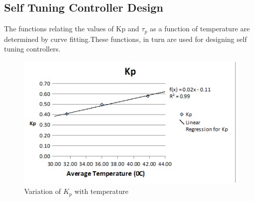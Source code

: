 \subsection{Self Tuning Controller Design}
\label{selftuningdesign}
The functions relating the values of  Kp and $\tau_p$ as a function of temperature are determined by curve fitting.These functions, in turn are used for designing self tuning controllers.

\begin{figure}[h]
\centering
	\includegraphics[width = \textwidth]{Vikas_self/report_tex/parameter_estimation/kp.jpg}
		\caption{Variation of $K_p$ with temperature}
	\label{kp}
\end{figure}

